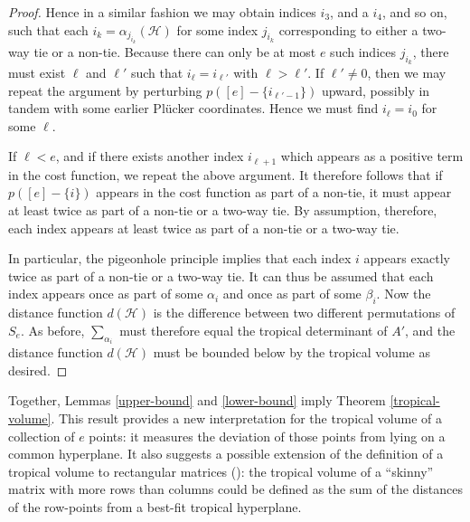 \documentclass[12pt]{extarticle}
\numberwithin{theorem}{section}
\begin{document}
\begin{proof}
Hence in a similar fashion we may obtain indices $i_3$, and a $i_4$, and so on, such that each $i_k = \alpha_{j_{i_k}}(\mathcal H)$ for some index $j_{i_k}$ corresponding to either a two-way tie or a non-tie. Because there can only be at most $e$ such indices $j_{i_k}$, there must exist $\ell$ and $\ell'$ such that $i_\ell = i_{\ell'}$ with $\ell>\ell'$. If $\ell'\neq 0$, then we may repeat the argument by perturbing $p([e]-\{i_{\ell'-1}\})$ upward, possibly in tandem with some earlier Pl\"ucker coordinates. Hence we must find $i_\ell =i_0$ for some $\ell$.

If $\ell < e$, and if there exists another index $i_{\ell+1}$ which appears as a positive term in the cost function, we repeat the above argument. It therefore follows that if $p([e]-\{i\})$ appears in the cost function as part of a non-tie, it must appear at least twice as part of a non-tie or a two-way tie. By assumption, therefore, each index appears at least twice as part of a non-tie or a two-way tie.


In particular, the pigeonhole principle implies that each index $i$ appears exactly twice as part of a non-tie or a two-way tie. It can thus be assumed that each index appears once as part of some $\alpha_i$ and once as part of some $\beta_i$. Now the distance function $d(\mathcal H)$ is the difference between two different permutations of $S_e$. As before, $\sum_{\alpha_i}$ must therefore equal the tropical determinant of $A'$, and the distance function $d(\mathcal H)$ must be bounded below by the tropical volume as desired.
\end{proof}

Together, Lemmas \ref{upper-bound} and \ref{lower-bound} imply Theorem \ref{tropical-volume}. This result provides a new interpretation for the tropical volume of a collection of $e$ points: it measures the deviation of those points from lying on a common hyperplane. It also suggests a possible extension of the definition of a tropical volume to rectangular matrices (\cite[Section 5]{DGJ}): the tropical volume of a ``skinny'' matrix with more rows than columns could be defined as the sum of the distances of the row-points from a best-fit tropical hyperplane.
\end{document}

